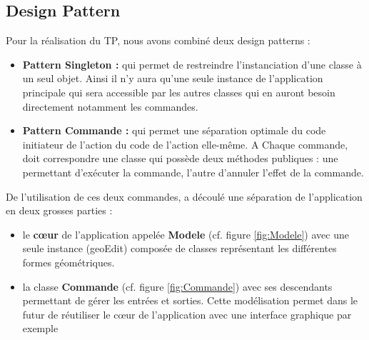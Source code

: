 \documentclass[12pt]{article}
\begin{document}
\subsection{Design Pattern}
Pour la réalisation du TP, nous avons combiné deux design patterns :
\begin{itemize}
\item \textbf{Pattern Singleton :} qui permet de restreindre l'instanciation d’une classe à un seul objet. Ainsi il n’y aura qu’une seule instance de l’application principale qui sera accessible par les autres classes qui en auront besoin directement notamment les commandes.
\item \textbf{Pattern Commande :} qui permet une séparation optimale du code initiateur de l’action du code de l’action elle-même. A Chaque commande, doit correspondre une classe qui possède deux méthodes publiques : une permettant d’exécuter la commande, l’autre d’annuler l’effet de la commande. 
\end{itemize}
De l’utilisation de ces deux commandes, a découlé une séparation de l’application en deux grosses parties :
\begin{itemize}
\item le \textbf{c\oe{}ur} de l’application appelée \textbf{Modele} (cf. figure \ref{fig:Modele}) avec une seule instance (geoEdit) composée de classes représentant les différentes formes géométriques.
\item la classe \textbf{Commande} (cf. figure \ref{fig:Commande}) avec ses descendants permettant de gérer les entrées et sorties. Cette modélisation permet dans le futur de réutiliser le c\oe{}ur de l’application avec une interface graphique par exemple
\end{itemize}
\end{document}
